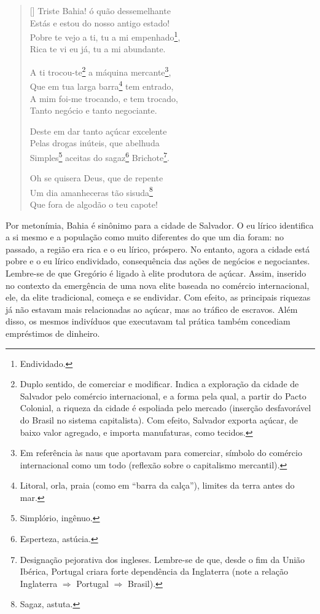 \documentclass[12pt]{book}
\begin{document}
			\begin{verse}[\versewidth]
				Triste Bahia! ó quão dessemelhante \\
				Estás e estou do nosso antigo estado! \\ 
				Pobre te vejo a ti, tu a mi empenhado\footnote{Endividado.}, \\
				Rica te vi eu já, tu a mi abundante.
				
				A ti trocou-te\footnote{Duplo sentido, de comerciar e modificar. Indica a exploração da cidade de Salvador pelo comércio internacional, e a forma pela qual, a partir do Pacto Colonial, a riqueza da cidade é espoliada pelo mercado (inserção desfavorável do Brasil no sistema capitalista). Com efeito, Salvador exporta açúcar, de baixo valor agregado, e importa manufaturas, como tecidos.} a máquina mercante\footnote{Em referência às naus que aportavam para comerciar, símbolo do comércio internacional como um todo (reflexão sobre o capitalismo mercantil).}, \\
				Que em tua larga barra\footnote{Litoral, orla, praia (como em ``barra da calça''), limites da terra antes do mar.} tem entrado, \\
				A mim foi-me trocando, e tem trocado, \\
				Tanto negócio e tanto negociante.
				
				Deste em dar tanto açúcar excelente \\
				Pelas drogas inúteis, que abelhuda \\
				Simples\footnote{Simplório, ingênuo.} aceitas do sagaz\footnote{Esperteza, astúcia.} Brichote\footnote{Designação pejorativa dos ingleses. Lembre-se de que, desde o fim da União Ibérica, Portugal criara forte dependência da Inglaterra (note a relação Inglaterra $\Rightarrow$ Portugal $\Rightarrow$ Brasil).}.
				
				Oh se quisera Deus, que de repente \\
				Um dia amanheceras tão sisuda\footnote{Sagaz, astuta.} \\
				Que fora de algodão o teu capote! \\
			\end{verse}
		\par Por metonímia, Bahia é sinônimo para a cidade de Salvador. O eu lírico identifica a si mesmo e a população como muito diferentes do que um dia foram: no passado, a região era rica e o eu lírico, próspero. No entanto, agora a cidade está pobre e o eu lírico endividado, consequência das ações de negócios e negociantes. Lembre-se de que Gregório é ligado à elite produtora de açúcar. Assim, inserido no contexto da emergência de uma nova elite baseada no comércio internacional, ele, da elite tradicional, começa e se endividar. Com efeito, as principais riquezas já não estavam mais relacionadas ao açúcar, mas ao tráfico de escravos. Além disso, os mesmos indivíduos que executavam tal prática também concediam empréstimos de dinheiro.
\end{document}
